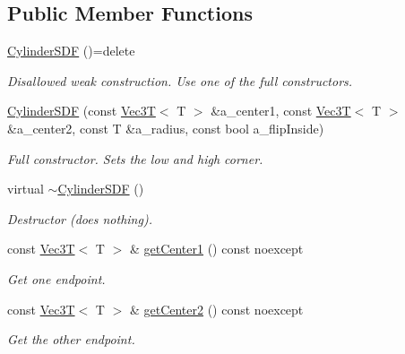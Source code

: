\subsection*{Public Member Functions}
\begin{DoxyCompactItemize}
\item 
\mbox{\label{classCylinderSDF_a4cad4283fea40d7e4f865a29f6b5bb20}} 
\hyperlink{classCylinderSDF_a4cad4283fea40d7e4f865a29f6b5bb20}{Cylinder\+S\+DF} ()=delete
\begin{DoxyCompactList}\small\item\em Disallowed weak construction. Use one of the full constructors. \end{DoxyCompactList}\item 
\hyperlink{classCylinderSDF_a0c710e871e7e7eb37f379c79c3412607}{Cylinder\+S\+DF} (const \hyperlink{classVec3T}{Vec3T}$<$ T $>$ \&a\+\_\+center1, const \hyperlink{classVec3T}{Vec3T}$<$ T $>$ \&a\+\_\+center2, const T \&a\+\_\+radius, const bool a\+\_\+flip\+Inside)
\begin{DoxyCompactList}\small\item\em Full constructor. Sets the low and high corner. \end{DoxyCompactList}\item 
\mbox{\label{classCylinderSDF_a974c6b114bc5dbf88c171de5328dcaf6}} 
virtual \hyperlink{classCylinderSDF_a974c6b114bc5dbf88c171de5328dcaf6}{$\sim$\+Cylinder\+S\+DF} ()
\begin{DoxyCompactList}\small\item\em Destructor (does nothing). \end{DoxyCompactList}\item 
const \hyperlink{classVec3T}{Vec3T}$<$ T $>$ \& \hyperlink{classCylinderSDF_a7f6134d1ef1fe08ffaf43ece08c84fe0}{get\+Center1} () const noexcept
\begin{DoxyCompactList}\small\item\em Get one endpoint. \end{DoxyCompactList}\item 
const \hyperlink{classVec3T}{Vec3T}$<$ T $>$ \& \hyperlink{classCylinderSDF_aa4188d330f841f04a3f7dba6d1ef9c8f}{get\+Center2} () const noexcept
\begin{DoxyCompactList}\small\item\em Get the other endpoint. \end{DoxyCompactList}\item 

\end{DoxyCompactItemize}
